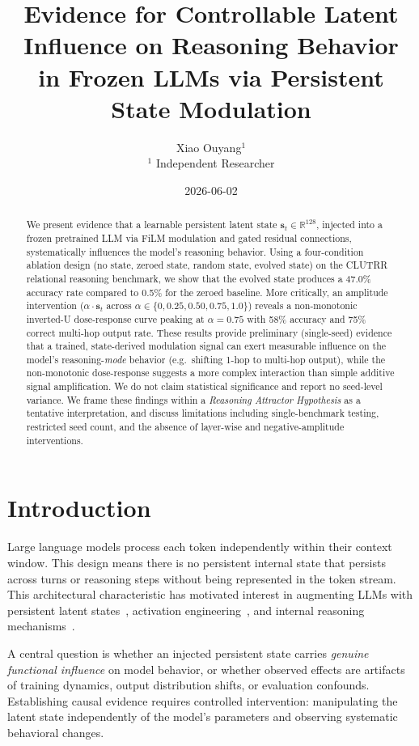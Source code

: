 \documentclass[11pt,a4paper]{article}
\title{Evidence for Controllable Latent Influence on Reasoning Behavior \\
\large in Frozen LLMs via Persistent State Modulation}
\author{Xiao Ouyang$^{1}$ \\
\small $^{1}$ Independent Researcher}
\date{2026-06-02}
\begin{document}
\maketitle

\begin{abstract}
We present evidence that a learnable persistent latent state $\mathbf{s}_t \in \mathbb{R}^{128}$, injected into a frozen pretrained LLM via FiLM modulation and gated residual connections, systematically influences the model's reasoning behavior. Using a four-condition ablation design (no state, zeroed state, random state, evolved state) on the CLUTRR relational reasoning benchmark, we show that the evolved state produces a 47.0\% accuracy rate compared to 0.5\% for the zeroed baseline. More critically, an amplitude intervention ($\alpha \cdot \mathbf{s}_t$ across $\alpha \in \{0, 0.25, 0.50, 0.75, 1.0\}$) reveals a non-monotonic inverted-U dose-response curve peaking at $\alpha = 0.75$ with 58\% accuracy and 75\% correct multi-hop output rate. These results provide preliminary (single-seed) evidence that a trained, state-derived modulation signal can exert measurable influence on the model's reasoning-\emph{mode} behavior (e.g.\ shifting 1-hop to multi-hop output), while the non-monotonic dose-response suggests a more complex interaction than simple additive signal amplification. We do not claim statistical significance and report no seed-level variance. We frame these findings within a \textit{Reasoning Attractor Hypothesis} as a tentative interpretation, and discuss limitations including single-benchmark testing, restricted seed count, and the absence of layer-wise and negative-amplitude interventions.
\end{abstract}

\section{Introduction}

Large language models process each token independently within their context window. This design means there is no persistent internal state that persists across turns or reasoning steps without being represented in the token stream. This architectural characteristic has motivated interest in augmenting LLMs with persistent latent states~\cite{graves2014neural, bulatov2022recurrent}, activation engineering~\cite{turner2023activation, zou2023representation}, and internal reasoning mechanisms~\cite{hao2024reasoning}.

A central question is whether an injected persistent state carries \textit{genuine functional influence} on model behavior, or whether observed effects are artifacts of training dynamics, output distribution shifts, or evaluation confounds. Establishing causal evidence requires controlled intervention: manipulating the latent state independently of the model's parameters and observing systematic behavioral changes.
\end{document}
